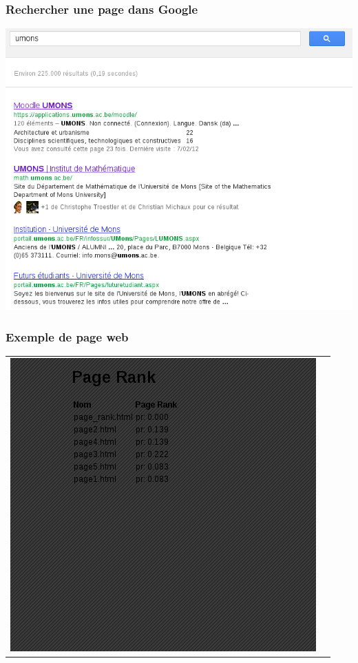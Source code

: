 \documentclass{beamer}
\begin{document}
\begin{frame}
  \frametitle{Rechercher une page dans Google}
  \includegraphics[scale=0.3]{umons_web}
\end{frame}


\begin{frame}
  \frametitle{Exemple de page web}
  \begin{tabular}{cc}
    \begin{minipage}{0.37\linewidth}\includegraphics[scale=0.3]{exemple_web}\end{minipage} & \begin{minipage}{0.4\linewidth}\end{minipage}
    
\end{tabular}

\end{frame}
\end{document}
